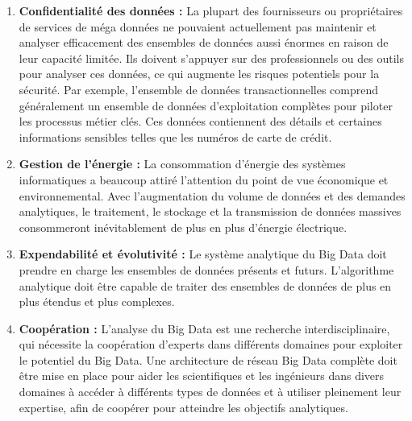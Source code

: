 \begin{enumerate}[label=\protect\ding{\value*}, start=182]
\item \textbf{Confidentialité des données :} La plupart des fournisseurs ou propriétaires de services de méga données ne pouvaient actuellement pas maintenir et analyser efficacement des ensembles de données aussi énormes en raison de leur capacité limitée. Ils doivent s'appuyer sur des professionnels ou des outils pour analyser ces données, ce qui augmente les risques potentiels pour la sécurité. Par exemple, l'ensemble de données transactionnelles comprend généralement un ensemble de données d'exploitation complètes pour piloter les processus métier clés. Ces données contiennent des détails et certaines informations sensibles telles que les numéros de carte de crédit.
\item \textbf{Gestion de l'énergie :} La consommation d'énergie des systèmes informatiques a beaucoup attiré l'attention du point de vue économique et environnemental. Avec l'augmentation du volume de données et des demandes analytiques, le traitement, le stockage et la transmission de données massives consommeront inévitablement de plus en plus d'énergie électrique.
\item \textbf{Expendabilité et évolutivité :} Le système analytique du Big Data doit prendre en charge les ensembles de données présents et futurs. L'algorithme analytique doit être capable de traiter des ensembles de données de plus en plus étendus et plus complexes.
\item \textbf{Coopération :} L'analyse du Big Data est une recherche interdisciplinaire, qui nécessite la coopération d'experts dans différents domaines pour exploiter le potentiel du Big Data. Une architecture de réseau Big Data complète doit être mise en place pour aider les scientifiques et les ingénieurs dans divers domaines à accéder à différents types de données et à utiliser pleinement leur expertise, afin de coopérer pour atteindre les objectifs analytiques.

\end{enumerate}
